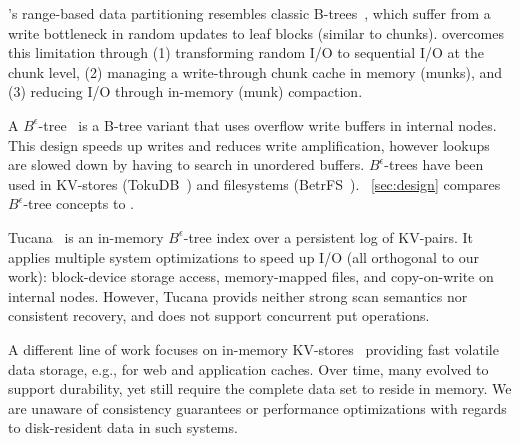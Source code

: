 \sys's range-based data partitioning 
 resembles classic B-trees~\cite{Knuth:1998:ACP:280635}, which suffer from a write bottleneck in random updates to 
leaf blocks (similar to chunks). \sys\/ overcomes this limitation through (1) transforming random I/O to sequential I/O at the chunk level, 
(2) managing a write-through chunk cache in memory (munks), and (3) reducing I/O  through in-memory (munk) compaction. 

A $B^{\epsilon}$-tree ~\cite{Brodal:2003:LBE:644108.644201}is a B-tree variant that uses overflow write buffers in internal nodes. 
This design speeds up writes and reduces write amplification, however lookups are slowed down by having to search in unordered 
buffers. $B^{\epsilon}$-trees have been used in KV-stores (TokuDB~\cite{TokuDB}) and filesystems (BetrFS~\cite{BetrFS}).  
~\cref{sec:design} compares $B^{\epsilon}$-tree concepts to \sys. 

Tucana~\cite{tucana} is an in-memory $B^{\epsilon}$-tree index over a persistent log of KV-pairs. It applies multiple system
optimizations to speed up I/O (all orthogonal to our work): block-device storage access, memory-mapped files, and copy-on-write 
on internal nodes. However, Tucana provids neither strong scan semantics nor consistent recovery, and does not support concurrent put operations.

A different line of work focuses on 
in-memory KV-stores~\cite{ignite, redis, memcached, Srinivasan:2016:AAR:3007263.3007276} providing fast volatile 
data storage, e.g., for web and application caches. Over time, many evolved to support durability,
yet still require the complete data set to reside in memory.
We are unaware of  consistency guarantees or performance optimizations with regards to disk-resident data in such systems. 

